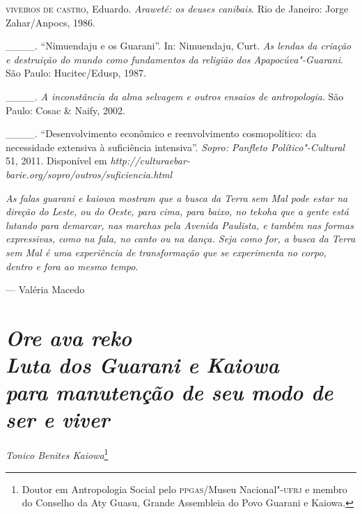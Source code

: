 \begin{Parskip}
\textsc{viveiros de castro}, Eduardo. \emph{Araweté: os deuses canibais}. Rio de
Janeiro: Jorge Zahar/Anpocs, 1986.

\_\_\_\_. ``Nimuendaju e os Guarani''. In: Nimuendaju, Curt. \emph{As lendas
da criação e destruição do mundo como fundamentos da religião dos
Apapocúva"-Guarani}. São Paulo: Hucitec/Edusp, 1987.

\_\_\_\_. \emph{A inconstância da alma selvagem e outros ensaios de
antropologia}. São Paulo: Cosac \& Naify, 2002.

\_\_\_\_. ``Desenvolvimento econômico e reenvolvimento cosmopolítico:
da necessidade extensiva à suficiência intensiva''. \emph{Sopro: Panfleto
Político"-Cultural} 51, 2011. Disponível em
\emph{http://culturaebar-
barie.org/sopro/outros/suficiencia.html}
\end{Parskip}

\clearpage

\vspace*{\fill}

\begin{flushright}
\begin{minipage}[c]{0.85\textwidth}
\raggedleft
\footnotesize
\emph{As falas guarani e kaiowa mostram que a busca da Terra sem Mal pode estar na
direção do Leste, ou do Oeste, para cima, para baixo, no \emph{tekoha} que a
gente está lutando para demarcar, nas marchas pela Avenida Paulista, e
também nas formas expressivas, como na fala, no canto ou na dança. Seja
como for, a busca da Terra sem Mal é uma experiência de transformação
que se experimenta no corpo, dentro e fora ao mesmo tempo}.

\smallskip
\hspace*{\fill}--- Valéria Macedo
\end{minipage}
\end{flushright}

\thispagestyle{empty}

\chapter*{\emph{Ore ava reko}\\
\large{\emph{Luta dos Guarani e Kaiowa\\ para
manutenção de seu modo de ser e viver}}}


\begin{flushright}
\emph{Tonico Benites Kaiowa}\footnote{Doutor em Antropologia Social pelo
\textsc{ppgas}/Museu Nacional"-\textsc{ufrj} e membro do Conselho da Aty Guasu, Grande
Assembleia do Povo Guarani e Kaiowa.}
\end{flushright}
\bigskip

